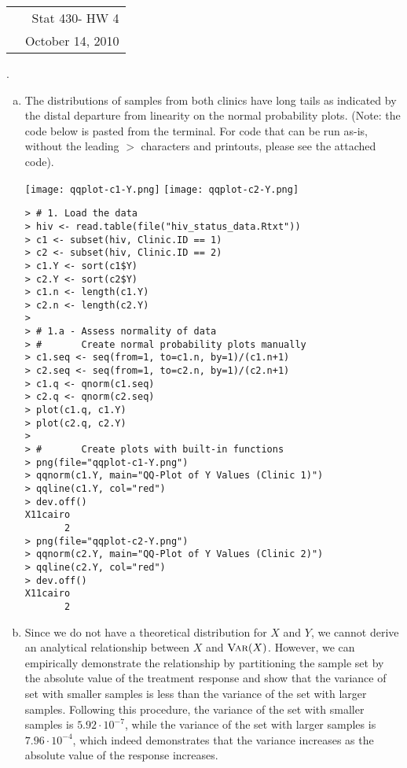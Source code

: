 \documentclass[a4paper, 10pt]{article}
\makeatletter
\newcommand{\class}{Stat 430}
\newcommand{\assignment}{HW 4}
\newcommand{\duedate}{October 14, 2010}
\newcounter{prob_num}
\newcommand{\problem}{\vspace{20pt}\arabic{prob_num}.\stepcounter{prob_num}\par}
\newcommand{\head}{\begin{center}\begin{tabular*}{\linewidth}{l@{\extracolsep{\fill}}r} & \class \;- \assignment \\ & \duedate \end{tabular*}\end{center} \hfill }
\makeatother
\begin{document}
 
\head
 
\problem

\begin{enumerate}[(a)]
\item The distributions of samples from both clinics have long tails as indicated by the distal departure from linearity on the normal probability plots. (Note: the code below is pasted from the terminal. For code that can be run as-is, without the leading $>$ characters and printouts, please see the attached code).

\begin{center}
  \texttt{[image: qqplot-c1-Y.png]}
  \texttt{[image: qqplot-c2-Y.png]}
\end{center}

{\scriptsize \begin{verbatim}
> # 1. Load the data
> hiv <- read.table(file("hiv_status_data.Rtxt"))
> c1 <- subset(hiv, Clinic.ID == 1)
> c2 <- subset(hiv, Clinic.ID == 2)
> c1.Y <- sort(c1$Y)
> c2.Y <- sort(c2$Y)
> c1.n <- length(c1.Y)
> c2.n <- length(c2.Y)
> 
> # 1.a - Assess normality of data
> #       Create normal probability plots manually
> c1.seq <- seq(from=1, to=c1.n, by=1)/(c1.n+1)
> c2.seq <- seq(from=1, to=c2.n, by=1)/(c2.n+1)
> c1.q <- qnorm(c1.seq)
> c2.q <- qnorm(c2.seq)
> plot(c1.q, c1.Y)
> plot(c2.q, c2.Y)
> 
> #       Create plots with built-in functions
> png(file="qqplot-c1-Y.png")
> qqnorm(c1.Y, main="QQ-Plot of Y Values (Clinic 1)")
> qqline(c1.Y, col="red")
> dev.off()
X11cairo 
       2 
> png(file="qqplot-c2-Y.png")
> qqnorm(c2.Y, main="QQ-Plot of Y Values (Clinic 2)")
> qqline(c2.Y, col="red")
> dev.off()
X11cairo 
       2
\end{verbatim} }

\item Since we do not have a theoretical distribution for $X$ and $Y$, we cannot derive an analytical relationship between $X$ and $\textsc{Var}(X)$. However, we can empirically demonstrate the relationship by partitioning the sample set by the absolute value of the treatment response and show that the variance of set with smaller samples is less than the variance of the set with larger samples. Following this procedure, the variance of the set with smaller samples is $5.92 \cdot 10^{-7}$, while the variance of the set with larger samples is $7.96\cdot 10^{-4}$, which indeed demonstrates that the variance increases as the absolute value of the response increases.


\end{enumerate}
\end{document}

